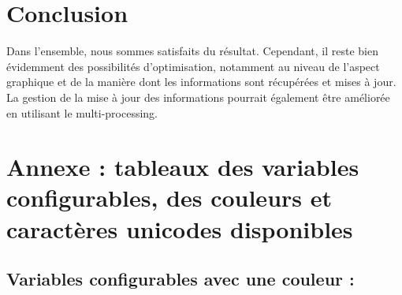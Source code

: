 \documentclass{article}
\begin{document}
\section{Conclusion}
Dans l'ensemble, nous sommes satisfaits du résultat. Cependant, il reste bien évidemment des possibilités d'optimisation, notamment au niveau de l'aspect graphique
 et de la manière dont les informations sont récupérées et mises à jour. La gestion de la mise à jour des informations pourrait également être améliorée en utilisant le multi-processing.

\section{Annexe : tableaux des variables configurables, des couleurs et caractères unicodes disponibles}
\subsection{Variables configurables avec une couleur :}
\end{document}
